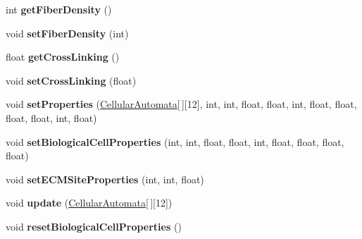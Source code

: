 \begin{DoxyCompactItemize}
\item 
\hypertarget{class_cellular_automata_a84c463e55d11ef4084c6d68e16a76645}{}int {\bfseries get\+Fiber\+Density} ()\label{class_cellular_automata_a84c463e55d11ef4084c6d68e16a76645}

\item 
\hypertarget{class_cellular_automata_a46567ff48f1e44ac47686ea988e58492}{}void {\bfseries set\+Fiber\+Density} (int)\label{class_cellular_automata_a46567ff48f1e44ac47686ea988e58492}

\item 
\hypertarget{class_cellular_automata_a0cbc5fe00823832dd4fca2d3bc63d5a6}{}float {\bfseries get\+Cross\+Linking} ()\label{class_cellular_automata_a0cbc5fe00823832dd4fca2d3bc63d5a6}

\item 
\hypertarget{class_cellular_automata_aa4857a92c3f7589a70d36863040f11d0}{}void {\bfseries set\+Cross\+Linking} (float)\label{class_cellular_automata_aa4857a92c3f7589a70d36863040f11d0}

\item 
\hypertarget{class_cellular_automata_ab7cfd5ad5cbf2b4af4dc686527958a93}{}void {\bfseries set\+Properties} (\hyperlink{class_cellular_automata}{Cellular\+Automata}\mbox{[}$\,$\mbox{]}\mbox{[}12\mbox{]}, int, int, float, float, int, float, float, float, float, int, float)\label{class_cellular_automata_ab7cfd5ad5cbf2b4af4dc686527958a93}

\item 
\hypertarget{class_cellular_automata_a0657178277b11f1a87db7f41a3811f20}{}void {\bfseries set\+Biological\+Cell\+Properties} (int, int, float, float, int, float, float, float, float)\label{class_cellular_automata_a0657178277b11f1a87db7f41a3811f20}

\item 
\hypertarget{class_cellular_automata_a48affb3b8e2d0c31b7550d118270bf0d}{}void {\bfseries set\+E\+C\+M\+Site\+Properties} (int, int, float)\label{class_cellular_automata_a48affb3b8e2d0c31b7550d118270bf0d}

\item 
\hypertarget{class_cellular_automata_a7a5900d5a52b1a7c719168cbb5a25baa}{}void {\bfseries update} (\hyperlink{class_cellular_automata}{Cellular\+Automata}\mbox{[}$\,$\mbox{]}\mbox{[}12\mbox{]})\label{class_cellular_automata_a7a5900d5a52b1a7c719168cbb5a25baa}

\item 
\hypertarget{class_cellular_automata_a97debd72a17c19cb6169e403b7ad1442}{}void {\bfseries reset\+Biological\+Cell\+Properties} ()\label{class_cellular_automata_a97debd72a17c19cb6169e403b7ad1442}


\end{DoxyCompactItemize}
